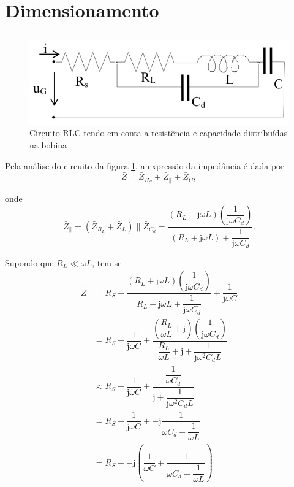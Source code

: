 \documentclass[a4paper, titlepage, portuguese]{article}
\begin{document}

	\section{Dimensionamento}
	\subsection{}
		\begin{figure}[h]
			\centering
			\includegraphics[width=0.6\linewidth]{circuito2.png}
			\caption{Circuito RLC tendo em conta a resistência e capacidade distribuídas na bobina}
			\label{fig:circuito2}
		\end{figure}
		\par
		Pela análise do circuito da figura \ref{fig:circuito2}, a expressão da impedância é dada por
		\begin{equation}
			\bar{Z} = \bar{Z}_{R_S} + \bar{Z}_{\parallel} + \bar{Z}_C,
		\end{equation}
		\par
		onde
		\begin{equation}
			\bar{Z}_{\parallel} = (\bar{Z}_{R_L} + \bar{Z}_{L}) \parallel \bar{Z}_{C_d} = \dfrac{\left(R_L + \mathrm{j} \omega L\right)\left(\dfrac{1}{\mathrm{j} \omega C_d}\right)}{(R_L + \mathrm{j} \omega L) + \dfrac{1}{\mathrm{j} \omega C_d}}.
		\end{equation}
		\par
		Supondo que $R_L \ll \omega L$, tem-se
		\begin{align}
			\bar{Z} &= R_S + \dfrac{\left(R_L + \mathrm{j} \omega L\right)\left(\dfrac{1}{\mathrm{j} \omega C_d}\right)}{R_L + \mathrm{j} \omega L + \dfrac{1}{\mathrm{j} \omega C_d}} + \dfrac{1}{\mathrm{j} \omega C} \nonumber \\
			&= R_S + \dfrac{1}{\mathrm{j} \omega C} + \dfrac{\left(\dfrac{R_L}{\omega L} + \mathrm{j}\right)\left(\dfrac{1}{\mathrm{j} \omega C_d}\right)}{\dfrac{R_L}{\omega L} + \mathrm{j} + \dfrac{1}{\mathrm{j} \omega^2 C_d L}} \nonumber \\
			&\approx R_S + \dfrac{1}{\mathrm{j} \omega C} + \dfrac{\dfrac{1}{\omega C_d}}{\mathrm{j} + \dfrac{1}{\mathrm{j} \omega^2 C_d L}} \nonumber \\
			&= R_S + \dfrac{1}{\mathrm{j} \omega C} + -\mathrm{j}\dfrac{1}{\omega C_d - \dfrac{1}{\omega L}} \nonumber \\
			&= R_S + -\mathrm{j}\left(\dfrac{1}{\omega C} + \dfrac{1}{\omega C_d - \dfrac{1}{\omega L}}\right) \\
		\end{align}
\end{document}
